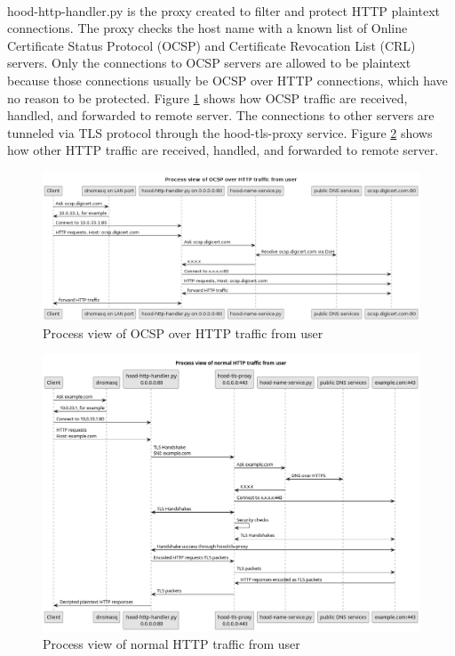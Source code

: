 \documentclass[mscthesis]{usiinfthesis}
\begin{document}
\paragraph{}
hood-http-handler.py is the proxy created to filter and protect HTTP plaintext connections. The proxy checks the host name with a known list of Online Certificate Status Protocol (OCSP) and Certificate Revocation List (CRL) servers. Only the connections to OCSP servers are allowed to be plaintext because those connections usually be OCSP over HTTP connections, which have no reason to be protected. Figure \ref{fig:ocsp-process-view} shows how OCSP traffic are received, handled, and forwarded to remote server. The connections to other servers are tunneled via TLS protocol through the hood-tls-proxy service. Figure \ref{fig:http-process-view} shows how other HTTP traffic are received, handled, and forwarded to remote server.

\begin{figure}[H]
  \includegraphics[width=\textheight, angle=90]{graphics/puml/process-ocsp-traffic.png}
  \caption{Process view of OCSP over HTTP traffic from user}
  \label{fig:ocsp-process-view}
\end{figure}

\begin{figure}[H]
  \includegraphics[width=\textheight, angle=90]{graphics/puml/process-http-traffic.png}
  \caption{Process view of normal HTTP traffic from user}
  \label{fig:http-process-view}
\end{figure}
\end{document}
